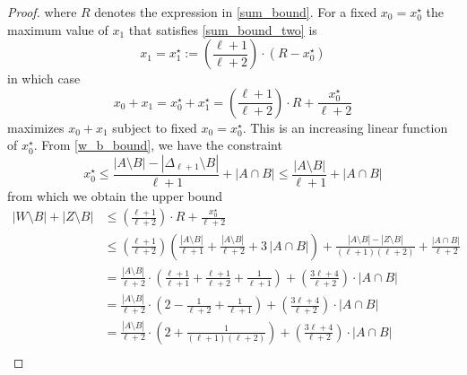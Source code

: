\documentclass{patmorin}
\newcommand{\pat}[1]{\textcolor{Blue}{[Pat: #1]}}
\newcommand{\hussein}[1]{\textcolor{purple}{HH: #1}}
\begin{document}
\begin{proof}
  where $R$ denotes the expression in \eqref{sum_bound}.
  For a fixed $x_0=x^\star_0$ the maximum value of $x_1$ that satisfies \eqref{sum_bound_two} is
  \[
    x_1 = x_1^\star:=\left(\frac{\ell+1}{\ell+2}\right)\cdot(R-x^{\star}_0)
  \]
  in which case
  \[
     x_0 + x_1 = x^\star_0+x^\star_1 = \left(\frac{\ell+1}{\ell+2}\right)\cdot R + \frac{x^\star_0}{\ell+2}
  \]
  maximizes $x_0+x_1$ subject to fixed $x_0=x_0^{\star}$.
  This is an increasing linear function of $x_0^{\star}$.  From \eqref{w_b_bound}, we have the constraint
  \[
     x_0^\star \le
     \frac{|A\setminus B|-|\Delta_{\ell+1}\setminus B|}{\ell+1}+|A\cap B|
     \le \frac{|A\setminus B|}{\ell+1}+|A\cap B|
  \]
  from which we obtain the upper bound
  \begin{align*}
    |W\setminus B|+|Z\setminus B|
    & \le \left(\frac{\ell+1}{\ell+2}\right)\cdot R +
    \frac{x_0^\star}{\ell+2} \\
    & \le \left(\frac{\ell+1}{\ell+2}\right)\left(\frac{|A\setminus B|}{\ell+1}+\frac{|A\setminus B|}{\ell+2}+3\,|A\cap B|\right)+\frac{|A\setminus B|-|Z\setminus B|}{(\ell+1)
    (\ell+2)}
    + \frac{|A\cap B|}{\ell+2}
    \\
    & = \frac{|A\setminus B|}{\ell+2}\cdot\left(\frac{\ell+1}{\ell+1}+\frac{\ell+1}{\ell+2}+\frac{1}{\ell+1}\right) +\left(\frac{3\ell+4}{\ell+2}\right)\cdot |A\cap B|  \\
    & = \frac{|A\setminus B|}{\ell+2}\cdot\left(2-\frac{1}{\ell+2}+\frac{1}{\ell+1}\right) +\left(\frac{3\ell+4}{\ell+2}\right)\cdot |A\cap B|  \\
    & = \frac{|A\setminus B|}{\ell+2}\cdot\left(2+\frac{1}{(\ell+1)(\ell+2)}\right) +\left(\frac{3\ell+4}{\ell+2}\right)\cdot |A\cap B|  \\

\end{align*}
\end{proof}
\end{document}
